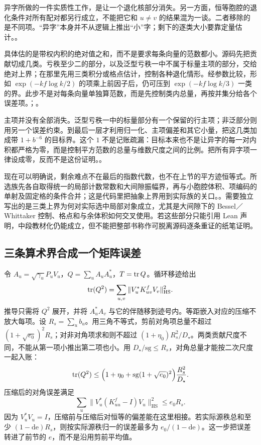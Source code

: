 异字所做的一件实质性工作，是让一个退化核部分消失。另一方面，恒等胞腔的退化条件对所有配对都另行成立，不能把它和 $u\ne v$ 的结果混为一谈。二者移除的是不同项。“异字”本身并不从逻辑上推出“小”字；剩下的逐类大小要靠定量估计。。

具体估的是带权内积的绝对值之和，而不是要求每条向量的范数都小。源码先把贡献切成几类。亏秩至少二的部分，以及泛型亏秩一中不属于标量主项的部分，交给绝对上界；在那里先用三类积分或格点估计，控制各种退化情形。经参数比较，形如 $\exp(-kf\log k/2)$ 的项乘上前因子后，仍可压到 $\exp(-kf\log k/3)$ 一类的界。此步不是对每条向量单独算范数，而是先控制类内总量，再按并集分给各个误差项。；。

主项并没有全部消失。泛型亏秩一中的标量部分有一个保留的行主项；非泛部分则用另一个误差约束。到最后一层才利用归一化、主项偏差和其它小量，把这几类加成带 $1+b^{-6}$ 的目标界。这个 $1$ 不是记账疏漏：目标本来也不是让异字的每一对内积都严格为零，而是控制平方范数的总量与维数尺度之间的比例。把所有异字项一律设成零，反而不是这份证明。。

现在可以明确说，剩余难点不在最后的指数代数，也不在上节的平方迹恒等式。所选族先各自取得统一的局部计数常数和大间隙振幅界，再与小胞腔体积、项编码的单射及固定格的条件合并；这是代码里把抽象上界用到实际族的关口。。需要独立写出的是三类上界为何对实际选中局部对象成立，尤其是大间隙下的 Bessel／Whittaker 控制、格点和与余体积如何交叉使用。若这些部分只能引用 Lean 声明，中段教材化仍能成立，但不能把整部书称作可脱离源码逐条重证的纸笔证明。

\subsection{三条算术界合成一个矩阵误差}
令 $A_u=\sqrt{\gamma_u}P_uV_u$，$Q=\sum_u A_uA_u^*$，$T=\operatorname{tr} Q$。循环移迹给出
\[
                \operatorname{tr}(Q^2)
                =\sum_{u,v}\|V_u^*K^f_{uv}V_v\|^2_{\mathrm{HS}}.
\]
推导只需将 $Q^2$ 展开，并将 $A_u^*A_v$ 与它的伴随移到迹号内。等距嵌入对应的压缩不放大每项。设 $R_s=\sum_u b_u$。用三角不等式，剪前对角项总量不超过 $(1+\sqrt{e_0})^2R_s$；对非对角项求和则不超过 $(1+\eta_0)R_s^2/D_\star$。两类贡献尺度不同，不能从第一项小推出第二项也小。用 $D_\star/\mathrm{sg}\le R_s$，对角总量才能按二次尺度一起入账：
\[
 \operatorname{tr}(Q^2)\le
 \Bigl(1+\eta_0+\mathrm{sg}(1+\sqrt{e_0})^2\Bigr)
              \frac{R_s^2}{D_\star}.
\]
压缩后的对角误差满足
\[
 \sum_u\|V_u^*(K^f_{uu}-I)V_u\|^2_{\mathrm{HS}}\le e_0 R_s.
\]
因为 $V_u^*V_u=I$，压缩前与压缩后对恒等的偏差能在这里相接。若实际源秩总和至少 $(1-\mathrm{de})R_s$，则按实际源秩归一的误差最多为 $e_0/(1-\mathrm{de})$。这一步把误差转进了前节的 $e$，而不是沿用剪前平均值。

